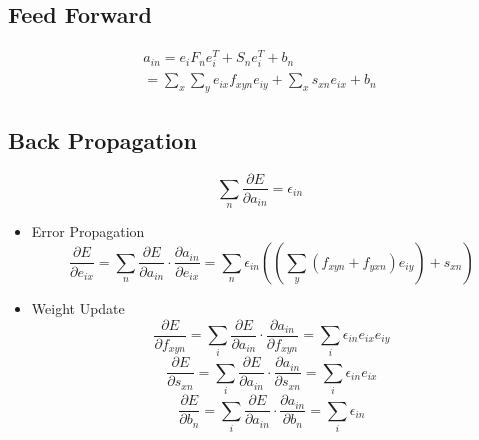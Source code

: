 \documentclass[12pt]{article}
\begin{document}
    \subsection{Feed Forward}
    \begin{equation}
    \begin{array}{l}
    a_{in} = e_iF_ne_i^T + S_ne_i^T + b_n \\
    = \sum_x \sum_y e_{ix}f_{xyn}e_{iy} + \sum_x s_{xn}e_{ix} + b_n
    \end{array}
    \end{equation}

    \subsection{Back Propagation}
    \begin{equation}
    \sum_n \frac{\partial E}{\partial a_{in}} = \epsilon_{in}
    \end{equation}
    \begin{itemize}
        \item Error Propagation
        \begin{equation}
        \frac{\partial E}{\partial e_{ix}} = \sum_n \frac{\partial E}{\partial a_{in}} \cdot \frac{\partial a_{in}}{\partial e_{ix}} = \sum_n  \epsilon_{in} ((\sum_y (f_{xyn} + f_{yxn}) e_{iy}) + s_{xn})
        \end{equation}

        \item Weight Update
        \begin{equation}
        \frac{\partial E}{\partial f_{xyn}} = \sum_i \frac{\partial E}{\partial a_{in}} \cdot \frac{\partial a_{in}}{\partial f_{xyn}} = \sum_i  \epsilon_{in} e_{ix} e_{iy}
        \end{equation}
        \begin{equation}
        \frac{\partial E}{\partial s_{xn}} = \sum_i \frac{\partial E}{\partial a_{in}} \cdot \frac{\partial a_{in}}{\partial s_{xn}} = \sum_i  \epsilon_{in} e_{ix}
        \end{equation}
        \begin{equation}
        \frac{\partial E}{\partial b_n} = \sum_i \frac{\partial E}{\partial a_{in}} \cdot \frac{\partial a_{in}}{\partial b_n} = \sum_i  \epsilon_{in}
        \end{equation}
    \end{itemize}
\end{document}
